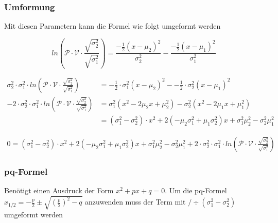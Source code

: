 \documentclass{article}
\begin{document}
\subsubsection{Umformung}
Mit diesen Parametern kann die Formel wie folgt umgeformt werden

\begin{equation} \label{trans:1}
ln(\mathcal{P} \cdot \mathcal{V} \cdot \frac{\sqrt{\sigma^{2}_2}}{\sqrt{\sigma^{2}_1}}) = \frac{-\frac{1}{2}(x-\mu_2)^2}{\sigma_{2}^2} - \frac{-\frac{1}{2}(x-\mu_1)^2}{\sigma_{1}^2}
\end{equation}

\begin{align}
\sigma_{2}^2 \cdot \sigma_{1}^2 \cdot ln(\mathcal{P} \cdot \mathcal{V} \cdot \frac{\sqrt{\sigma^{2}_2}}{\sqrt{\sigma^{2}_1}}) &= -\frac{1}{2} \cdot \sigma_{1}^2 (x-\mu_2)^2 - -\frac{1}{2} \cdot \sigma_{2}^2 (x-\mu_1)^2
\\
-2 \cdot \sigma_{2}^2 \cdot \sigma_{1}^2 \cdot ln(\mathcal{P} \cdot \mathcal{V} \cdot \frac{\sqrt{\sigma^{2}_2}}{\sqrt{\sigma^{2}_1}}) &=
\sigma_{1}^2 (x^2 - 2\mu_{2}x + \mu_{2}^2) - 
\sigma_{2}^2 (x^2- 2\mu_{1}x + \mu_{1}^2) 
\\
& = (\sigma_{1}^2 - \sigma_{2}^2) \cdot x^2 +
2(-\mu_{2}\sigma_{1}^2 + \mu_{1} \sigma_{2}^2)x 
+ \sigma_{1}^2 \mu_{2}^2 - \sigma_{2}^2\mu_{1}^2
\end{align}


\begin{equation}
\begin{aligned}
0 = 
(\sigma_{1}^2 - \sigma_{2}^2) \cdot x^2 +
2(-\mu_{2}\sigma_{1}^2 + \mu_{1} \sigma_{2}^2)x 
+ \sigma_{1}^2 \mu_{2}^2 - \sigma_{2}^2\mu_{1}^2
+ 2 \cdot \sigma_{2}^2 \cdot \sigma_{1}^2 \cdot ln(\mathcal{P} \cdot \mathcal{V} \cdot \frac{\sqrt{\sigma^{2}_2}}{\sqrt{\sigma^{2}_1}})
\end{aligned}
\end{equation}

\subsubsection{pq-Formel}
Benötigt einen Ausdruck der Form $x^2 + px +q = 0$.
Um die pq-Formel $x_{1/2} = - \frac{p}{2} \pm \sqrt{(\frac{p}{2})^2-q}$ anzuwenden muss der Term mit $/ \div (\sigma_{1}^2 - \sigma_{2}^2)$ umgeformt werden
\end{document}
